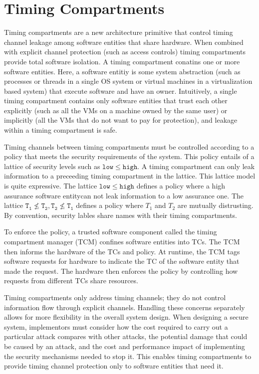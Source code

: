 \section{Timing Compartments}
Timing compartments are a new architecture primitive that control timing 
channel leakage among software entities that share hardware. When combined with 
explicit channel protection (such as access controls) timing compartments 
provide total software isolation.
A timing compartment conatins one or more software entities. Here, a software 
entitiy is some system abstraction (such as processes or threads in a single OS 
system or virtual machines in a virtualization based system) that execute 
software and have an owner. Intuitively, a single timing compartment contains 
only software entities that trust each other explicitly (such as all the VMs on 
a machine owned by the same user) or implicitly (all the VMs that do not want 
to pay for protection), and leakage within a timing compartment is safe.

Timing channels between timing compartments must be controlled according to a 
policy that meets the security requirements of the system. This policy entails 
of a lattice of security levels such as $\mathtt{low} \leq
\mathtt{high}$. A timing compartment can only leak information to a preceeding 
timing compartment in the lattice. This lattice model is quite expressive. The 
lattice $\mathtt{low} \leq \mathtt{high}$ defines a policy where a high 
assurance software entitycan not leak information to a low assurance one. The 
lattice $\mathtt{T_1} \nleq \mathtt{T_2}, \mathtt{T_2} \nleq \mathtt{T_1}$ 
defines a policy where $T_1$ and $T_2$ are mutually distrusting. By convention, 
security lables share names with their timing compartments. 

To enforce the policy, a trusted software component called the timing 
compartment manager (TCM) confines software entities into TCs. The TCM then 
informs the hardware of the TCs and policy. At runtime, the TCM tags software 
requests for hardware to indicate the TC of the software entity that made the 
request. The hardware then enforces the policy by controlling how requests from 
different TCs share resources.

Timing compartments only address timing channels; they do not control 
information flow through explicit channels. Handling these concerns separately 
allows for more flexibility in the overall system design.  When designing a 
secure system, implementors must consider how the cost required to carry out a 
particular attack compares with other attacks, the potential damage that could 
be caused by an attack, and the cost and performance impact of implementing the 
security mechanisms needed to stop it. This enables timing compartments to 
provide timing channel protection only to software entities that need it.

